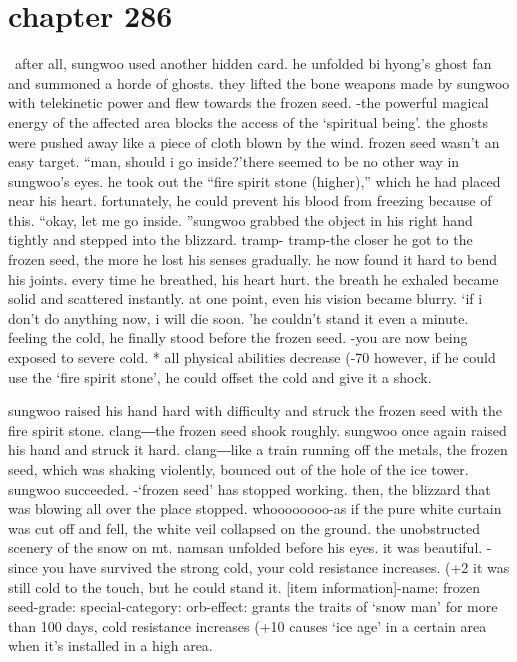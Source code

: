 \section{chapter 286}






 after all, sungwoo used another hidden card.
 he unfolded bi hyong’s ghost fan and summoned a horde of ghosts.
 they lifted the bone weapons made by sungwoo with telekinetic power and flew towards the frozen seed.
-the powerful magical energy of the affected area blocks the access of the ‘spiritual being’.
the ghosts were pushed away like a piece of cloth blown by the wind.
 frozen seed wasn’t an easy target.
“man, should i go inside?’there seemed to be no other way in sungwoo’s eyes.
 he took out the “fire spirit stone (higher),” which he had placed near his heart.
 fortunately, he could prevent his blood from freezing because of this.
“okay, let me go inside.
”sungwoo grabbed the object in his right hand tightly and stepped into the blizzard.
tramp- tramp-the closer he got to the frozen seed, the more he lost his senses gradually.
 he now found it hard to bend his joints.
 every time he breathed, his heart hurt.
 the breath he exhaled became solid and scattered instantly.
 at one point, even his vision became blurry.
‘if i don’t do anything now, i will die soon.
’he couldn’t stand it even a minute.
 feeling the cold, he finally stood before the frozen seed.
-you are now being exposed to severe cold.
* all physical abilities decrease (-70%
however, if he could use the ‘fire spirit stone’, he could offset the cold and give it a shock.

sungwoo raised his hand hard with difficulty and struck the frozen seed with the fire spirit stone.
clang―the frozen seed shook roughly.
 sungwoo once again raised his hand and struck it hard.
clang―like a train running off the metals, the frozen seed, which was shaking violently, bounced out of the hole of the ice tower.
 sungwoo succeeded.
-‘frozen seed’ has stopped working.
then, the blizzard that was blowing all over the place stopped.
whoooooooo-as if the pure white curtain was cut off and fell, the white veil collapsed on the ground.
 the unobstructed scenery of the snow on mt.
 namsan unfolded before his eyes.
 it was beautiful.
-since you have survived the strong cold, your cold resistance increases.
 (+2%
 it was still cold to the touch, but he could stand it.
[item information]-name: frozen seed-grade: special-category: orb-effect: grants the traits of ‘snow man’ for more than 100 days, cold resistance increases (+10%
 causes ‘ice age’ in a certain area when it’s installed in a high area.

